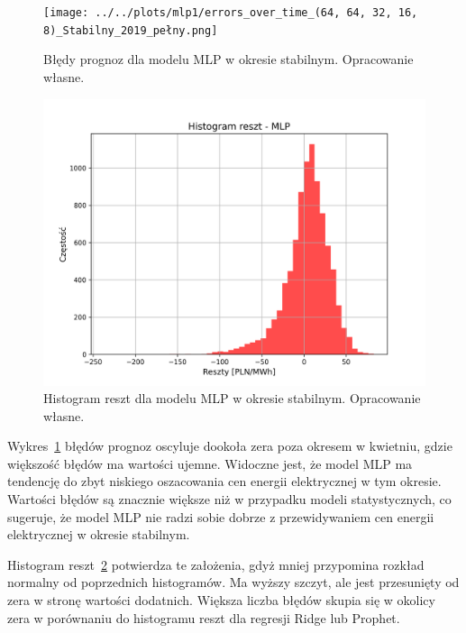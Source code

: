 \begin{figure}[H]
    \centering
    \texttt{[image: ../../plots/mlp1/errors\_over\_time\_(64, 64, 32, 16, 8)\_Stabilny\_2019\_pełny.png]}
    \caption{Błędy prognoz dla modelu MLP w okresie stabilnym. Opracowanie własne.}
    \label{fig:mlp_errors_stable_period}
\end{figure}

\begin{figure}[H]
    \centering
    \includegraphics[width=1.0\textwidth]{../../plots/mlp1/mlp_errors_histogram_full_stable_(64, 64, 32, 16, 8).png}
    \caption{Histogram reszt dla modelu MLP w okresie stabilnym. Opracowanie własne.}
    \label{fig:mlp_residuals_stable_period}
\end{figure}

Wykres~\ref{fig:mlp_errors_stable_period} błędów prognoz oscyluje dookoła zera poza okresem w kwietniu, gdzie większość błędów ma wartości ujemne. Widoczne jest, że model MLP ma tendencję do zbyt niskiego oszacowania cen energii elektrycznej w tym okresie. Wartości błędów są znacznie większe niż w przypadku modeli statystycznych, co sugeruje, że model MLP nie radzi sobie dobrze z przewidywaniem cen energii elektrycznej w okresie stabilnym.

Histogram reszt~\ref{fig:mlp_residuals_stable_period} potwierdza te założenia, gdyż mniej przypomina rozkład normalny od poprzednich histogramów. Ma wyższy szczyt, ale jest przesunięty od zera w stronę wartości dodatnich. Większa liczba błędów skupia się w okolicy zera w porównaniu do histogramu reszt dla regresji Ridge lub Prophet.

